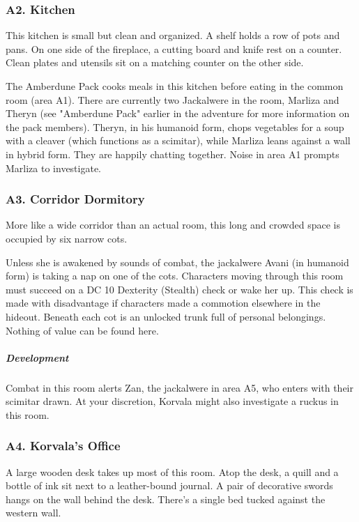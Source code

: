 \documentclass[10pt,a4paper,twoside,bg=print,twocolumn,openany,nodeprecatedcode]{dndbook}
\begin{document}
\subsubsection{A2. Kitchen}
\begin{DndReadAloud}{}
This kitchen is small but clean and organized. A shelf holds a row of pots and pans. On one side of the fireplace, a cutting board and knife rest on a counter. Clean plates and utensils sit on a matching counter on the other side. 

\end{DndReadAloud}

The Amberdune Pack cooks meals in this kitchen before eating in the common room (area A1). There are currently two Jackalwere in the room, Marliza and Theryn (see "Amberdune Pack" earlier in the adventure for more information on the pack members). Theryn, in his humanoid form, chops vegetables for a soup with a cleaver (which functions as a scimitar), while Marliza leans against a wall in hybrid form. They are happily chatting together. Noise in area A1 prompts Marliza to investigate.

\subsubsection{A3. Corridor Dormitory}
\begin{DndReadAloud}{}
More like a wide corridor than an actual room, this long and crowded space is occupied by six narrow cots. 

\end{DndReadAloud}

Unless she is awakened by sounds of combat, the jackalwere Avani (in humanoid form) is taking a nap on one of the cots. Characters moving through this room must succeed on a DC 10 Dexterity (Stealth) check or wake her up. This check is made with disadvantage if characters made a commotion elsewhere in the hideout. Beneath each cot is an unlocked trunk full of personal belongings. Nothing of value can be found here.

\subparagraph{Development}
Combat in this room alerts Zan, the jackalwere in area A5, who enters with their scimitar drawn. At your discretion, Korvala might also investigate a ruckus in this room.

\subsubsection{A4. Korvala's Office}
\begin{DndReadAloud}{}
A large wooden desk takes up most of this room. Atop the desk, a quill and a bottle of ink sit next to a leather-bound journal. A pair of decorative swords hangs on the wall behind the desk. There's a single bed tucked against the western wall. 

\end{DndReadAloud}
\end{document}
